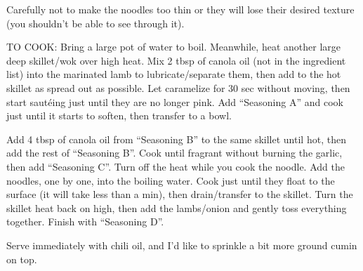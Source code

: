 \documentclass[
]{article}
\begin{document}
Carefully not to make the noodles too thin or they will lose their desired texture (you shouldn't be able to see through it).

TO COOK: Bring a large pot of water to boil. Meanwhile, heat another large deep skillet/wok over high heat. Mix 2 tbsp of canola oil (not in the ingredient list) into the marinated lamb to lubricate/separate them, then add to the hot skillet as spread out as possible. Let caramelize for 30 sec without moving, then start sautéing just until they are no longer pink. Add ``Seasoning A'' and cook just until it starts to soften, then transfer to a bowl.

Add 4 tbsp of canola oil from ``Seasoning B'' to the same skillet until hot, then add the rest of ``Seasoning B''. Cook until fragrant without burning the garlic, then add ``Seasoning C''. Turn off the heat while you cook the noodle. Add the noodles, one by one, into the boiling water. Cook just until they float to the surface (it will take less than a min), then drain/transfer to the skillet. Turn the skillet heat back on high, then add the lambs/onion and gently toss everything together. Finish with ``Seasoning D''.

Serve immediately with chili oil, and I'd like to sprinkle a bit more ground cumin on top.

  

\printindex
\end{document}

